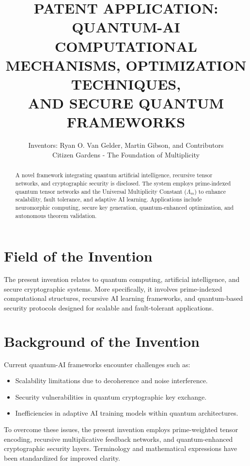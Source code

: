 \documentclass[12pt]{article}
\begin{document}
\title{\textbf{PATENT APPLICATION: QUANTUM-AI COMPUTATIONAL MECHANISMS, OPTIMIZATION TECHNIQUES, \\ AND SECURE QUANTUM FRAMEWORKS}}
\author{Inventors: Ryan O. Van Gelder, Martin Gibson, and Contributors \\ Citizen Gardens - The Foundation of Multiplicity}
\date{}
\maketitle

\newpage
\begin{abstract}
A novel framework integrating quantum artificial intelligence, recursive tensor networks, and cryptographic security is disclosed. The system employs prime-indexed quantum tensor networks and the Universal Multiplicity Constant ($\Lambda_m$) to enhance scalability, fault tolerance, and adaptive AI learning. Applications include neuromorphic computing, secure key generation, quantum-enhanced optimization, and autonomous theorem validation.
\end{abstract}

\newpage
\section*{Field of the Invention}
The present invention relates to quantum computing, artificial intelligence, and secure cryptographic systems. More specifically, it involves prime-indexed computational structures, recursive AI learning frameworks, and quantum-based security protocols designed for scalable and fault-tolerant applications.

\section*{Background of the Invention}
Current quantum-AI frameworks encounter challenges such as:
\begin{itemize}
    \item Scalability limitations due to decoherence and noise interference.
    \item Security vulnerabilities in quantum cryptographic key exchange.
    \item Inefficiencies in adaptive AI training models within quantum architectures.
\end{itemize}
To overcome these issues, the present invention employs prime-weighted tensor encoding, recursive multiplicative feedback networks, and quantum-enhanced cryptographic security layers. Terminology and mathematical expressions have been standardized for improved clarity.
\end{document}

